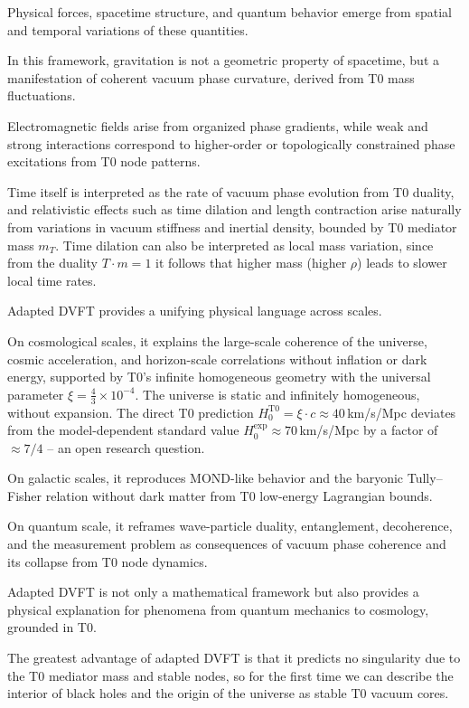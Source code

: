 \documentclass[12pt,a4paper]{article}
\begin{document}
	Physical forces, spacetime structure, and quantum behavior emerge from spatial and temporal variations of these quantities.
	
	In this framework, gravitation is not a geometric property of spacetime, but a manifestation of coherent vacuum phase curvature, derived from T0 mass fluctuations.
	
	Electromagnetic fields arise from organized phase gradients, while weak and strong interactions correspond to higher-order or topologically constrained phase excitations from T0 node patterns.
	
	Time itself is interpreted as the rate of vacuum phase evolution from T0 duality, and relativistic effects such as time dilation and length contraction arise naturally from variations in vacuum stiffness and inertial density, bounded by T0 mediator mass $m_T$. Time dilation can also be interpreted as local mass variation, since from the duality $T \cdot m = 1$ it follows that higher mass (higher $\rho$) leads to slower local time rates.
	
	Adapted DVFT provides a unifying physical language across scales.
	
	On cosmological scales, it explains the large-scale coherence of the universe, cosmic acceleration, and horizon-scale correlations without inflation or dark energy, supported by T0's infinite homogeneous geometry with the universal parameter $\xi = \frac{4}{3} \times 10^{-4}$. The universe is static and infinitely homogeneous, without expansion. The direct T0 prediction $H_0^{\text{T0}} = \xi \cdot c \approx 40\,$km/s/Mpc deviates from the model-dependent standard value $H_0^{\text{exp}} \approx 70\,$km/s/Mpc by a factor of $\approx 7/4$ -- an open research question.
	
	On galactic scales, it reproduces MOND-like behavior and the baryonic Tully–Fisher relation without dark matter from T0 low-energy Lagrangian bounds.
	
	On quantum scale, it reframes wave-particle duality, entanglement, decoherence, and the measurement problem as consequences of vacuum phase coherence and its collapse from T0 node dynamics.
	
	Adapted DVFT is not only a mathematical framework but also provides a physical explanation for phenomena from quantum mechanics to cosmology, grounded in T0.
	
	The greatest advantage of adapted DVFT is that it predicts no singularity due to the T0 mediator mass and stable nodes, so for the first time we can describe the interior of black holes and the origin of the universe as stable T0 vacuum cores.
	
\end{document}
